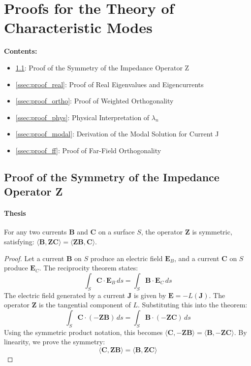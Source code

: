\documentclass[11pt, a4paper]{report}
\begin{document}
\section{Proofs for the Theory of Characteristic Modes} \label{sec:tcm_proofs}
\noindent\textbf{Contents:}
\begin{itemize}
    \item \cref{ssec:proof_symm}: Proof of the Symmetry of the Impedance Operator Z
    \item \cref{ssec:proof_real}: Proof of Real Eigenvalues and Eigencurrents
    \item \cref{ssec:proof_ortho}: Proof of Weighted Orthogonality
    \item \cref{ssec:proof_phys}: Physical Interpretation of $\lambda_n$
    \item \cref{ssec:proof_modal}: Derivation of the Modal Solution for Current J
    \item \cref{ssec:proof_ff}: Proof of Far-Field Orthogonality
\end{itemize}

\subsection{Proof of the Symmetry of the Impedance Operator Z} \label{ssec:proof_symm}
\paragraph{Thesis} For any two currents $\mathbf{B}$ and $\mathbf{C}$ on a surface $S$, the operator $\mathbf{Z}$ is symmetric, satisfying: $\langle \mathbf{B}, \mathbf{Z}\mathbf{C} \rangle = \langle \mathbf{Z}\mathbf{B}, \mathbf{C} \rangle$.
\begin{proof}
Let a current $\mathbf{B}$ on $S$ produce an electric field $\mathbf{E}_B$, and a current $\mathbf{C}$ on $S$ produce $\mathbf{E}_C$. The reciprocity theorem states:
\begin{equation}
\int_S \mathbf{C} \cdot \mathbf{E}_B \,ds = \int_S \mathbf{B} \cdot \mathbf{E}_C \,ds
\end{equation}
The electric field generated by a current $\mathbf{J}$ is given by $\mathbf{E} = -L(\mathbf{J})$. The operator $\mathbf{Z}$ is the tangential component of $L$. Substituting this into the theorem:
\begin{equation}
\int_S \mathbf{C} \cdot (-\mathbf{Z}\mathbf{B}) \,ds = \int_S \mathbf{B} \cdot (-\mathbf{Z}\mathbf{C}) \,ds
\end{equation}
Using the symmetric product notation, this becomes $\langle \mathbf{C}, -\mathbf{Z}\mathbf{B} \rangle = \langle \mathbf{B}, -\mathbf{Z}\mathbf{C} \rangle$. By linearity, we prove the symmetry:
\begin{equation}
\langle \mathbf{C}, \mathbf{Z}\mathbf{B} \rangle = \langle \mathbf{B}, \mathbf{Z}\mathbf{C} \rangle
\end{equation}
\end{proof}
\end{document}
